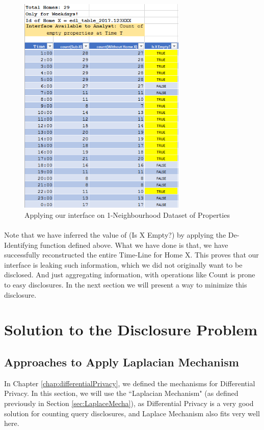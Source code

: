 \documentclass[12pt]{report}
\theoremstyle{named}
\begin{document}
\begin{figure}[ht]
\centering
        \includegraphics[width=80mm,scale=1]{Images/1NeighbourhoodAttack.PNG}
    \caption{Applying our interface on 1-Neighbourhood Dataset of Properties}
    \label{fig:1NeighAttack}
\end{figure}
\paragraph{}
Note that we have inferred the value of (Is X Empty?) by applying the De-Identifying function defined above. What we have done is that, we have successfully reconstructed the entire Time-Line for Home X. This proves that our interface is leaking such information, which we did not originally want to be disclosed. And just aggregating information, with operations like Count is prone to easy disclosures. In the next section we will present a way to minimize this disclosure.

\section{Solution to the Disclosure Problem}
\subsection{Approaches to Apply Laplacian Mechanism}
In Chapter \ref{chap:differentialPrivacy}, we defined the mechanisms for Differential Privacy. In this section, we will  use the ``Laplacian Mechanism" (as defined previously in Section \ref{sec:LaplaceMecha}), as Differential Privacy is a very good solution for counting query disclosures, and Laplace Mechanism also fits very well here.
\end{document}

